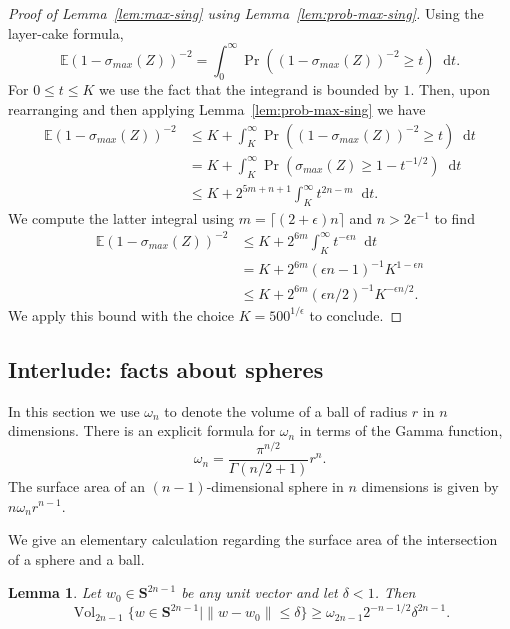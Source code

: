 \documentclass[11pt]{article}
\theoremstyle{plain}
\theoremstyle{plain}
\newtheorem{lem}{Lemma}
\theoremstyle{plain}
\theoremstyle{plain}
\theoremstyle{plain}
\theoremstyle{plain}
\theoremstyle{plain}
\theoremstyle{remark}
\theoremstyle{remark}
\theoremstyle{plain}
\theoremstyle{plain}
\theoremstyle{plain}
\theoremstyle{plain}
\newcommand{\eps}{\epsilon}
\DeclareMathOperator{\vol}{Vol}
\newcommand{\diff}{\mathop{}\!\mathrm{d}}
\newcommand{\Expec}{\mathbb E}
\newcommand{\Prob}{\Pr}
\newcommand{\Sphere}{{\mathbf S}}
\begin{document}
\begin{proof}[Proof of Lemma~\ref{lem:max-sing} using Lemma~\ref{lem:prob-max-sing}]
Using the layer-cake formula,
\begin{equation}
\Expec (1-\sigma_{max}(Z))^{-2} =
\int_0^\infty \Prob( (1-\sigma_{max}(Z))^{-2} \geq t)\diff t.
\end{equation}
For $0\leq t\leq K$ we use the fact that the integrand is bounded by $1$.  Then, upon rearranging and
then applying Lemma~\ref{lem:prob-max-sing} we have
\begin{equation}
\begin{split}
\Expec (1-\sigma_{max}(Z))^{-2}
&\leq K + \int_K^\infty \Prob( (1-\sigma_{max}(Z))^{-2} \geq t)\diff t \\
&= K + \int_K^\infty \Prob( \sigma_{max}(Z) \geq  1- t^{-1/2})\diff t \\
&\leq K + 2^{5m+n+1} \int_K^\infty t^{2n-m} \diff t.
\end{split}
\end{equation}
We compute the latter integral using $m=\lceil(2+\eps)n\rceil$ and $n > 2\eps^{-1}$ to find
\begin{equation}
\begin{split}
\Expec (1-\sigma_{max}(Z))^{-2}
&\leq K + 2^{6m} \int_K^\infty t^{-\eps n} \diff t\\
&= K + 2^{6m} (\eps n-1)^{-1} K^{1-\eps n} \\
&\leq  K + 2^{6m} (\eps n/2)^{-1} K^{-\eps n/2}.
\end{split}
\end{equation}
We apply this bound with the choice $K = 500^{1/\eps}$ to conclude.
\end{proof}

\subsection{Interlude: facts about spheres}
In this section we use $\omega_n$ to denote the volume of a ball of radius $r$ in $n$ dimensions.  There is an
explicit formula for $\omega_n$ in terms of the Gamma function,
\begin{equation}
\label{eq:sphere-vol}
\omega_n = \frac{\pi^{n/2}}{\Gamma(n/2+1)}r^n.
\end{equation}
The surface area of an $(n-1)$-dimensional sphere in $n$ dimensions is given by $n\omega_nr^{n-1}$.

We give an elementary calculation regarding the surface area of the intersection of a sphere
and a ball.
\begin{lem}
\label{lem:cap-volume}
Let $w_0\in\Sphere^{2n-1}$ be any unit vector and let $\delta<1$.  Then
\[
\vol_{2n-1} \{w\in\Sphere^{2n-1} \mid \|w-w_0\|\leq \delta\}
\geq \omega_{2n-1} 2^{-n-1/2} \delta^{2n-1}.
\]
\end{lem}
\end{document}
